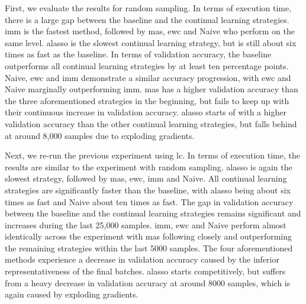 First, we evaluate the results for random sampling. In terms of execution time, there is a large gap between the baseline and the continual learning strategies. \gls{imm} is
the fastest method, followed by \gls{mas}, \gls{ewc} and Naive who perform on the same level. \gls{alasso} is the slowest continual learning strategy, but is still about six times as fast as the baseline. 
In terms of validation accuracy, the baseline outperforms all continual learning strategies by at least ten percentage points. Naive, \gls{ewc} and \gls{imm} demonstrate a similar accuracy
progression, with \gls{ewc} and Naive marginally outperforming \gls{imm}. \gls{mas} has a higher validation accuracy than the three aforementioned strategies in the beginning, but fails to keep up with their
continuous increase in validation accuracy. \gls{alasso} starts of with a higher validation accuracy than the other continual learning strategies, but falls behind at around 8,000 samples due to exploding
gradients. \par
 

Next, we re-run the previous experiment using \gls{lc}. In terms of execution time, the results are similar to the experiment with random sampling. \gls{alasso} is again the slowest strategy,
followed by \gls{mas}, \gls{ewc}, \gls{imm} and Naive. All continual learning strategies are significantly faster than the baseline, with \gls{alasso} being about six times as fast and Naive
about ten times as fast. The gap in validation accuracy between the baseline and the continual learning strategies remains significant and increases during the last 25,000 samples. 
\gls{imm}, \gls{ewc} and Naive perform almost identically across the experiment with \gls{mas} following closely and outperforming the remaining strategies within the last 5000 samples. The four aforementioned methods
experience a decrease in validation accuracy caused by the inferior representativeness of the final batches. \gls{alasso} starts competitively, but suffers from a heavy decrease in validation accuracy at around 8000 samples,
which is again caused by exploding gradients. \par


